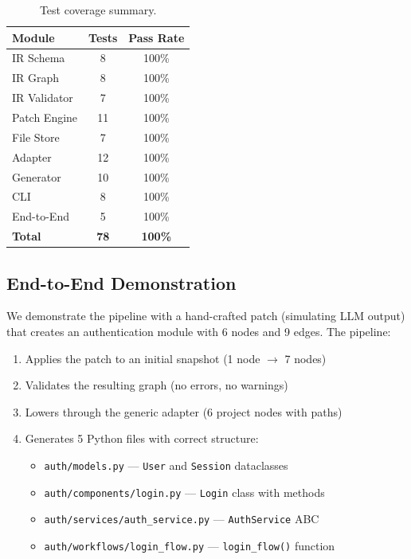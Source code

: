 \documentclass[11pt,a4paper]{article}
\begin{document}
\begin{table}[h]
\centering
\caption{Test coverage summary.}
\label{tab:tests}
\begin{tabular}{@{}lcc@{}}
\toprule
\textbf{Module} & \textbf{Tests} & \textbf{Pass Rate} \\
\midrule
IR Schema & 8 & 100\% \\
IR Graph & 8 & 100\% \\
IR Validator & 7 & 100\% \\
Patch Engine & 11 & 100\% \\
File Store & 7 & 100\% \\
Adapter & 12 & 100\% \\
Generator & 10 & 100\% \\
CLI & 8 & 100\% \\
End-to-End & 5 & 100\% \\
\midrule
\textbf{Total} & \textbf{78} & \textbf{100\%} \\
\bottomrule
\end{tabular}
\end{table}

\subsection{End-to-End Demonstration}

We demonstrate the pipeline with a hand-crafted patch (simulating LLM output) that creates an authentication module with 6 nodes and 9 edges. The pipeline:

\begin{enumerate}
    \item Applies the patch to an initial snapshot (1 node $\rightarrow$ 7 nodes)
    \item Validates the resulting graph (no errors, no warnings)
    \item Lowers through the generic adapter (6 project nodes with paths)
    \item Generates 5 Python files with correct structure:
    \begin{itemize}
        \item \texttt{auth/models.py} --- \texttt{User} and \texttt{Session} dataclasses
        \item \texttt{auth/components/login.py} --- \texttt{Login} class with methods
        \item \texttt{auth/services/auth\_service.py} --- \texttt{AuthService} ABC
        \item \texttt{auth/workflows/login\_flow.py} --- \texttt{login\_flow()} function
    \end{itemize}
\end{enumerate}
\end{document}
